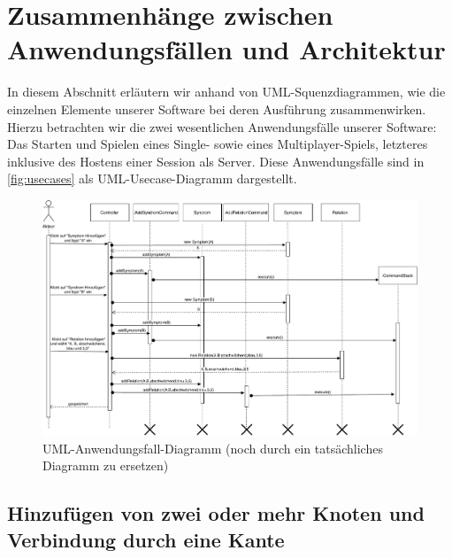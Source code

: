 \documentclass[enabledeprecatedfontcommands,fontsize=12pt,paper=a4,twoside,parskip=half]{scrartcl}
\begin{document}
\clearpage

\section[Zusammenhänge zwischen Anwendungsfällen und Architektur]{Zusammenhänge zwischen Anwendungsfällen und Architektur}
\label{sec:zusammenheange}

In diesem Abschnitt erläutern wir anhand von UML-Squenzdiagrammen, wie die einzelnen Elemente unserer Software bei deren Ausführung zusammenwirken. Hierzu betrachten wir die zwei wesentlichen Anwendungsfälle unserer Software: Das Starten und Spielen eines Single- sowie eines Multiplayer-Spiels, letzteres inklusive des Hostens einer Session als Server. Diese Anwendungsfälle sind in \autoref{fig:usecases} als UML-Usecase-Diagramm dargestellt.

\begin{figure}[H]
    \centering
    \includegraphics[width=\textwidth]{Bilder/SyndromansatzSWP.pdf}
    \caption{UML-Anwendungsfall-Diagramm (noch durch ein tatsächliches Diagramm zu ersetzen)}
    \label{fig:usecases}
\end{figure}
\clearpage

\subsection{Hinzufügen von zwei oder mehr Knoten und Verbindung durch eine Kante}
\end{document}

